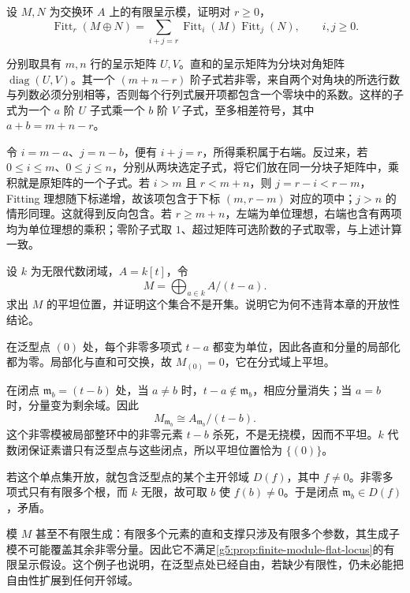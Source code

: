 \begin{exercise}\label{g5:ex:fitting-direct-sum}
	设 \(M,N\) 为交换环 \(A\) 上的有限呈示模，证明对 \(r\geq0\)，
	\[
		\operatorname{Fitt}_r(M\oplus N)
		=\sum_{i+j=r}\operatorname{Fitt}_i(M)\operatorname{Fitt}_j(N),
		\qquad i,j\geq0.
	\]
\end{exercise}
\begin{solution}
	分别取具有 \(m,n\) 行的呈示矩阵 \(U,V\)。直和的呈示矩阵为分块对角矩阵 \(\operatorname{diag}(U,V)\)。其一个 \((m+n-r)\) 阶子式若非零，来自两个对角块的所选行数与列数必须分别相等，否则每个行列式展开项都包含一个零块中的系数。这样的子式为一个 \(a\) 阶 \(U\) 子式乘一个 \(b\) 阶 \(V\) 子式，至多相差符号，其中 \(a+b=m+n-r\)。

	令 \(i=m-a\)、\(j=n-b\)，便有 \(i+j=r\)，所得乘积属于右端。反过来，若 \(0\leq i\leq m\)、\(0\leq j\leq n\)，分别从两块选定子式，将它们放在同一分块子矩阵中，乘积就是原矩阵的一个子式。若 \(i>m\) 且 \(r<m+n\)，则 \(j=r-i<r-m\)，Fitting 理想随下标递增，故该项包含于下标 \((m,r-m)\) 对应的项中；\(j>n\) 的情形同理。这就得到反向包含。若 \(r\geq m+n\)，左端为单位理想，右端也含有两项均为单位理想的乘积；零阶子式取 \(1\)、超过矩阵可选阶数的子式取零，与上述计算一致。
\end{solution}

\begin{exercise}\label{g5:ex:nonfinite-flat-locus}
	设 \(k\) 为无限代数闭域，\(A=k[t]\)，令
	\[
		M=\bigoplus_{a\in k}A/(t-a).
	\]
	求出 \(M\) 的平坦位置，并证明这个集合不是开集。说明它为何不违背本章的开放性结论。
\end{exercise}
\begin{solution}
	在泛型点 \((0)\) 处，每个非零多项式 \(t-a\) 都变为单位，因此各直和分量的局部化都为零。局部化与直和可交换，故 \(M_{(0)}=0\)，它在分式域上平坦。

	在闭点 \(\mathfrak m_b=(t-b)\) 处，当 \(a\ne b\) 时，\(t-a\notin\mathfrak m_b\)，相应分量消失；当 \(a=b\) 时，分量变为剩余域。因此
	\[
		M_{\mathfrak m_b}\cong A_{\mathfrak m_b}/(t-b).
	\]
	这个非零模被局部整环中的非零元素 \(t-b\) 杀死，不是无挠模，因而不平坦。\(k\) 代数闭保证素谱只有泛型点与这些闭点，所以平坦位置恰为 \(\{(0)\}\)。

	若这个单点集开放，就包含泛型点的某个主开邻域 \(D(f)\)，其中 \(f\ne0\)。非零多项式只有有限多个根，而 \(k\) 无限，故可取 \(b\) 使 \(f(b)\ne0\)。于是闭点 \(\mathfrak m_b\in D(f)\)，矛盾。

	模 \(M\) 甚至不有限生成：有限多个元素的直和支撑只涉及有限多个参数，其生成子模不可能覆盖其余非零分量。因此它不满足\cref{g5:prop:finite-module-flat-locus}的有限呈示假设。这个例子也说明，在泛型点处已经自由，若缺少有限性，仍未必能把自由性扩展到任何开邻域。
\end{solution}


